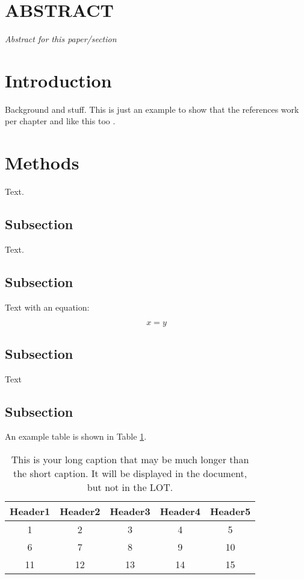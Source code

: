 \newpage
\normalsize
\doublespacing
\renewcommand{\thechapter}{\arabic{chapter}}
\section*{ABSTRACT} 
\textit{Abstract for this paper/section}

\section{Introduction}
Background and stuff. This is just an example to show that the references work per chapter \cite{book2} and like this too \cite{article2}.

\section{Methods}

Text.

\subsection{Subsection}

Text.

\subsection{Subsection}

Text with an equation:

\begin{equation}
x = y
\end{equation}

\subsection{Subsection}

Text

\subsection{Subsection}

An example table is shown in Table \ref{tab:the_same_from_ch2}.

\begin{table}[!ht]
\centering
\caption[This is your short caption for LOT]{This is your long caption that may be much longer than the short caption. It will be displayed in the document, but not in the LOT.}
\label{tab:the_same_from_ch2}
\begin{tabular}{|c|c|c|c|c|}
\hline
Header1 & Header2 & Header3  & Header4  & Header5 \\ \hline
1 & 2 & 3 & 4 & 5 \\ \hline
6 & 7 & 8 & 9 & 10 \\ \hline
11 & 12  & 13  & 14  & 15 \\ \hline
\end{tabular}
\end{table}

